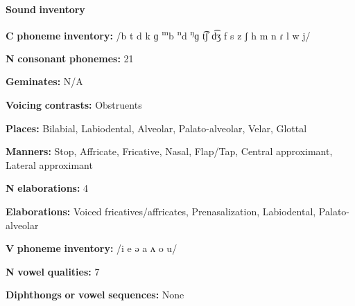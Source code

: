 \begin{styleBody}
\textbf{Sound} \textbf{inventory}
\end{styleBody}

\begin{styleBody}
\textbf{C} \textbf{phoneme} \textbf{inventory:} /b t d k ɡ \textsuperscript{m}b \textsuperscript{n}d \textsuperscript{ŋ}ɡ t͡ʃ d͡ʒ f s z ʃ h m n ɾ l w j/
\end{styleBody}

\begin{styleBody}
\textbf{N} \textbf{consonant} \textbf{phonemes:} 21
\end{styleBody}

\begin{styleBody}
\textbf{Geminates:} N/A
\end{styleBody}

\begin{styleBody}
\textbf{Voicing} \textbf{contrasts:} Obstruents
\end{styleBody}

\begin{styleBody}
\textbf{Places:} Bilabial, Labiodental, Alveolar, Palato-alveolar, Velar, Glottal
\end{styleBody}

\begin{styleBody}
\textbf{Manners:} Stop, Affricate, Fricative, Nasal, Flap/Tap, Central approximant, Lateral approximant
\end{styleBody}

\begin{styleBody}
\textbf{N} \textbf{elaborations:} 4
\end{styleBody}

\begin{styleBody}
\textbf{Elaborations:} Voiced fricatives/affricates, Prenasalization, Labiodental, Palato-alveolar
\end{styleBody}

\begin{styleBody}
\textbf{V} \textbf{phoneme} \textbf{inventory:} /i e ə a ʌ o u/
\end{styleBody}

\begin{styleBody}
\textbf{N} \textbf{vowel} \textbf{qualities:} 7
\end{styleBody}

\begin{styleBody}
\textbf{Diphthongs} \textbf{or} \textbf{vowel} \textbf{sequences:} None
\end{styleBody}


